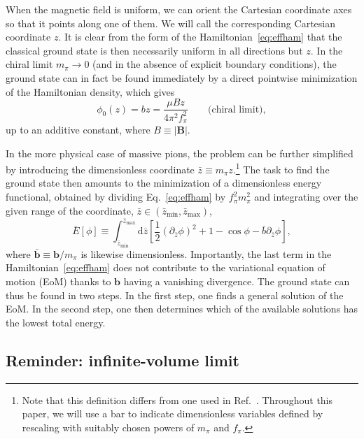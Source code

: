\documentclass[pdflatex,iicol,sn-mathphys-num]{sn-jnl}
\let\m=\mu
\let\p=\phi
\let\de=\partial
\newcommand{\dd}{\text{d}}%
\newcommand{\vek}[1]{\bm{#1}}%
\newcommand{\bmag}{b}%
\begin{document}
When the magnetic field is uniform, we can orient the Cartesian coordinate axes so that it points along one of them. We will call the corresponding Cartesian coordinate $z$. It is clear from the form of the Hamiltonian~\eqref{eq:effham} that the classical ground state is then necessarily uniform in all directions but $z$. In the chiral limit $m_\pi\to0$ (and in the absence of explicit boundary conditions), the ground state can in fact be found immediately by a direct pointwise minimization of the Hamiltonian density, which gives
\begin{equation}
\p_0(z)=\bmag z=\frac{\m Bz}{4\pi^2f_\pi^2}\qquad\text{(chiral limit)},
\label{eq:vacuniformchiral}
\end{equation}
up to an additive constant, where $B\equiv|\vek B|$.

In the more physical case of massive pions, the problem can be further simplified by introducing the dimensionless coordinate $\bar z\equiv m_\pi z$.\footnote{Note that this definition differs from one used in Ref.~\cite{Brauner:2016pko}. Throughout this paper, we will use a bar to indicate dimensionless variables defined by rescaling with suitably chosen powers of $m_\pi$ and $f_\pi$.} The task to find the ground state then amounts to the minimization of a dimensionless energy functional, obtained by dividing Eq.~\eqref{eq:effham} by $f_\pi^2m_\pi^2$ and integrating over the given range of the coordinate, $\bar z\in(\bar z_\text{min},\bar z_\text{max})$,
\begin{equation}
\bar E[\p]\equiv\int_{\bar z_\text{min}}^{\bar z_\text{max}}\dd\bar z\left[\frac{1}{2}(\de_{\bar z}\p)^2+1-\cos\p-\bar\bmag\de_{\bar z}\p\right],
\label{eq:dimlessE}
\end{equation}
where $\bar{\vek\bmag}\equiv\vek\bmag/m_\pi$ is likewise dimensionless. Importantly, the last term in the Hamiltonian~\eqref{eq:effham} does not contribute to the variational equation of motion (EoM) thanks to $\vek\bmag$ having a vanishing divergence. The ground state can thus be found in two steps. In the first step, one finds a general solution of the EoM. In the second step, one then determines which of the available solutions has the lowest total energy.


\subsection{Reminder: infinite-volume limit}
\label{subsec:uniformBreminder}
\end{document}
